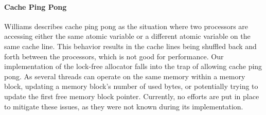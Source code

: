 \paragraph{Cache Ping Pong}
\label{par:detailed_lock_free_ping_pong}
Williams\cite{williams_safety_off} describes cache ping pong as the situation where two processors are accessing either the same atomic variable or a different atomic variable on the same cache line.
This behavior results in the cache lines being shuffled back and forth between the processors, which is not good for performance.
Our implementation of the lock-free allocator falls into the trap of allowing cache ping pong.
As several threads can operate on the same memory within a memory block, updating a memory block's number of used bytes, or
potentially trying to update the first free memory block pointer.
Currently, no efforts are put in place to mitigate these issues, as they were not known during its implementation.
